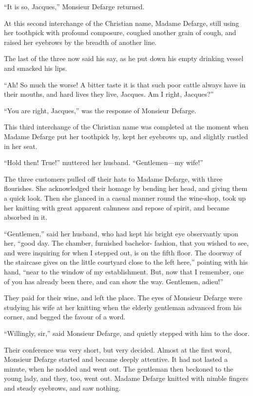 ``It is so, Jacques,'' Monsieur Defarge returned.

At this second interchange of the Christian name, Madame Defarge,
still using her toothpick with profound composure, coughed another
grain of cough, and raised her eyebrows by the breadth of another line.

The last of the three now said his say, as he put down his empty
drinking vessel and smacked his lips.

``Ah!  So much the worse!  A bitter taste it is that such poor cattle
always have in their mouths, and hard lives they live, Jacques.
Am I right, Jacques?''

``You are right, Jacques,'' was the response of Monsieur Defarge.

This third interchange of the Christian name was completed at the
moment when Madame Defarge put her toothpick by, kept her eyebrows
up, and slightly rustled in her seat.

``Hold then!  True!'' muttered her husband.  ``Gentlemen---my wife!''

The three customers pulled off their hats to Madame Defarge, with
three flourishes.  She acknowledged their homage by bending her head,
and giving them a quick look.  Then she glanced in a casual manner
round the wine-shop, took up her knitting with great apparent
calmness and repose of spirit, and became absorbed in it.

``Gentlemen,'' said her husband, who had kept his bright eye
observantly upon her, ``good day.  The chamber, furnished bachelor-%
fashion, that you wished to see, and were inquiring for when I
stepped out, is on the fifth floor.  The doorway of the staircase
gives on the little courtyard close to the left here,'' pointing with
his hand, ``near to the window of my establishment.  But, now that I
remember, one of you has already been there, and can show the way.
Gentlemen, adieu!''

They paid for their wine, and left the place.  The eyes of Monsieur
Defarge were studying his wife at her knitting when the elderly
gentleman advanced from his corner, and begged the favour of a word.

``Willingly, sir,'' said Monsieur Defarge, and quietly stepped with him
to the door.

Their conference was very short, but very decided.  Almost at the
first word, Monsieur Defarge started and became deeply attentive.
It had not lasted a minute, when he nodded and went out.  The
gentleman then beckoned to the young lady, and they, too, went out.
Madame Defarge knitted with nimble fingers and steady eyebrows, and
saw nothing.

